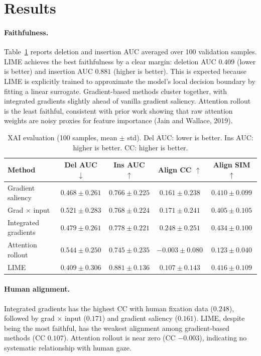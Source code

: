 \documentclass{article}
\begin{document}
\section{Results}

\paragraph{Faithfulness.}
Table~\ref{tab:xai} reports deletion and insertion AUC averaged over 100 validation samples. LIME achieves the best faithfulness by a clear margin: deletion AUC $0.409$ (lower is better) and insertion AUC $0.881$ (higher is better). This is expected because LIME is explicitly trained to approximate the model's local decision boundary by fitting a linear surrogate. Gradient-based methods cluster together, with integrated gradients slightly ahead of vanilla gradient saliency. Attention rollout is the least faithful, consistent with prior work showing that raw attention weights are noisy proxies for feature importance (Jain and Wallace, 2019).

\begin{table}[t]
\centering
\caption{XAI evaluation (100 samples, mean $\pm$ std). Del AUC: lower is better. Ins AUC: higher is better. CC: higher is better.}
\label{tab:xai}
\small
\begin{tabular}{lcccc}
\toprule
Method & Del AUC $\downarrow$ & Ins AUC $\uparrow$ & Align CC $\uparrow$ & Align SIM $\uparrow$ \\
\midrule
Gradient saliency & $0.468 \pm 0.261$ & $0.766 \pm 0.225$ & $0.161 \pm 0.238$ & $0.410 \pm 0.099$ \\
Grad $\times$ input & $0.521 \pm 0.283$ & $0.768 \pm 0.224$ & $0.171 \pm 0.241$ & $0.405 \pm 0.105$ \\
Integrated gradients & $0.479 \pm 0.261$ & $0.778 \pm 0.221$ & $\mathbf{0.248 \pm 0.251}$ & $\mathbf{0.434 \pm 0.100}$ \\
Attention rollout & $0.544 \pm 0.250$ & $0.745 \pm 0.235$ & $-0.003 \pm 0.080$ & $0.123 \pm 0.040$ \\
LIME & $\mathbf{0.409 \pm 0.306}$ & $\mathbf{0.881 \pm 0.136}$ & $0.107 \pm 0.143$ & $0.416 \pm 0.109$ \\
\bottomrule
\end{tabular}
\end{table}

\paragraph{Human alignment.}
Integrated gradients has the highest CC with human fixation data ($0.248$), followed by grad$\,\times\,$input ($0.171$) and gradient saliency ($0.161$). LIME, despite being the most faithful, has the weakest alignment among gradient-based methods (CC $0.107$). Attention rollout is near zero (CC $-0.003$), indicating no systematic relationship with human gaze.
\end{document}
